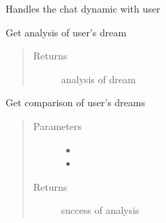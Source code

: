 \documentclass[letterpaper,10pt,english]{sphinxmanual}
\begin{document}
\begin{fulllineitems}
\label{\detokenize{index:Fralysis.Conversation.Conversation}}
Handles the chat dynamic with user

\begin{fulllineitems}
\label{\detokenize{index:Fralysis.Conversation.Conversation.get_analysis}}
Get analysis of user’s dream
\begin{quote}\begin{description}
\item[{Returns}] \leavevmode
analysis of dream

\end{description}\end{quote}

\end{fulllineitems}


\begin{fulllineitems}
\label{\detokenize{index:Fralysis.Conversation.Conversation.get_combined_analysis}}
Get comparison of user’s dreams
\begin{quote}\begin{description}
\item[{Parameters}] \leavevmode\begin{itemize}
\item {} 
 \textendash{} 

\item {} 
 \textendash{} 

\end{itemize}

\item[{Returns}] \leavevmode
success of analysis


\end{description}
\end{quote}
\end{fulllineitems}
\end{fulllineitems}
\end{document}
